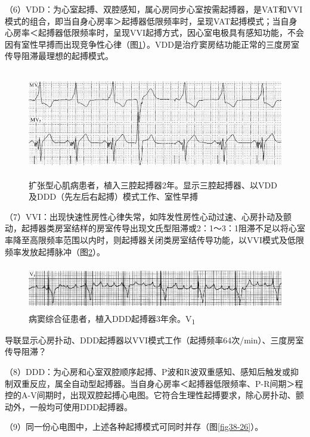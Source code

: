 （6）VDD：为心室起搏、双腔感知，属心房同步心室按需起搏器，是VAT和VVI模式的组合，即当自身心房率＞起搏器低限频率时，呈现VAT起搏模式；当自身心房率＜起搏器低限频率时，呈现VVI起搏方式，因心室电极具有感知功能，不会因有室性早搏而出现竞争性心律（图\ref{fig38-24}）。VDD是治疗窦房结功能正常的三度房室传导阻滞最理想的起搏模式。

\begin{figure}[!htbp]
 \centering
 \includegraphics[width=5.58333in,height=1.85417in]{./images/Image00627.jpg}
 \captionsetup{justification=centering}
 \caption{扩张型心肌病患者，植入三腔起搏器2年。显示三腔起搏器、以VDD及DDD（先左后右起搏）模式工作、室性早搏}
 \label{fig38-24}
  \end{figure} 

（7）VVI：出现快速性房性心律失常，如阵发性房性心动过速、心房扑动及颤动，起搏器类房室结样的房室传导出现文氏型阻滞或2：1～3：1阻滞不足以将心室率降至高限频率范围以内时，则起搏器关闭类房室结传导功能，以VVI模式及低限频率发放起搏脉冲（图\ref{fig38-25}）。

\begin{figure}[!htbp]
 \centering
 \includegraphics[width=5.58333in,height=0.77083in]{./images/Image00628.jpg}
 \captionsetup{justification=centering}
 \caption{病窦综合征患者，植入DDD起搏器3年余。V\textsubscript{1}}
 \label{fig38-25}
  \end{figure} 
导联显示心房扑动、DDD起搏器以VVI模式工作（起搏频率64次/min）、三度房室传导阻滞？

（8）DDD：为心房和心室双腔顺序起搏、P波和R波双重感知、感知后触发或抑制双重反应，属全自动型起搏器。当自身心房率＜起搏器低限频率、P-R间期＞程控的A-V间期时，出现双腔起搏心电图。它符合生理性起搏要求，除心房扑动、颤动外，一般均可使用DDD起搏器。

（9）同一份心电图中，上述各种起搏模式可同时并存（图\ref{fig38-26}）。

